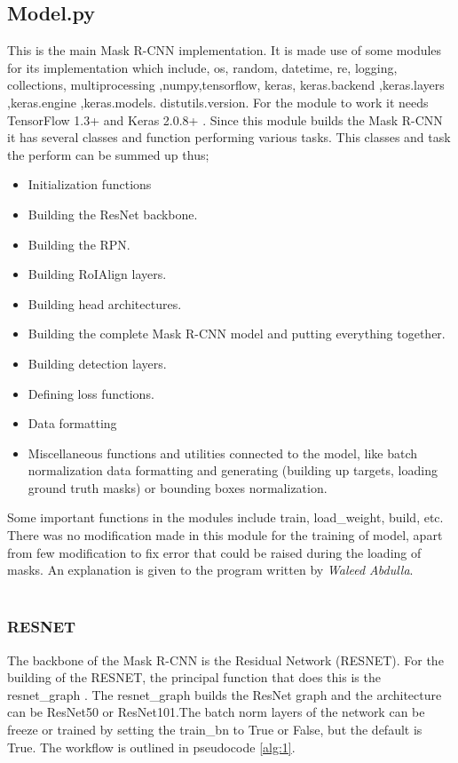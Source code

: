  \subsection{Model.py} \label{sec:model}
 This is the main Mask R-CNN implementation. It is made use of some modules for its implementation which include, os, random, datetime, re, logging, collections, multiprocessing ,numpy,tensorflow, keras, keras.backend ,keras.layers ,keras.engine  ,keras.models. distutils.version. For the module to work it needs TensorFlow 1.3+ and Keras 2.0.8+ .  Since this module builds the Mask R-CNN it has several classes and function performing various tasks. This classes and task the perform can be summed up thus;
 \begin{itemize}
   \item 	Initialization functions
   \item Building the ResNet backbone.
   \item Building the RPN.
   \item Building RoIAlign layers.
   \item Building head architectures.
   \item Building the complete Mask R-CNN model and putting everything together.
   \item Building detection layers.
   \item Defining loss functions.
   \item	Data formatting
   \item Miscellaneous functions and utilities connected to the model, like batch normalization data formatting and generating (building up targets, loading ground truth masks) or bounding boxes normalization.
   
 \end{itemize}
 Some important functions in the modules include train, load\_weight, build, etc. There was no modification made in this module for the training of model, apart from few modification to fix error that could be raised during the loading of masks. An explanation is given to the program written by \textit{Waleed Abdulla}.
\\ 
\\
\subsubsection{ RESNET}
 The backbone of the Mask R-CNN is the Residual Network (RESNET). For the building of the RESNET, the principal function that does this is the resnet\_graph . The  resnet\_graph builds the ResNet graph and the  architecture can be ResNet50 or ResNet101.The batch norm layers of the network can be freeze or trained by setting the train\_bn to True or False, but the default is True. The workflow is outlined in pseudocode \ref{alg:1}.
\\
\\

